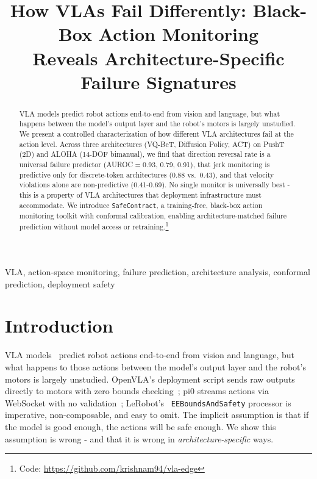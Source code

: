\documentclass[conference]{IEEEtran}
\begin{document}
\title{How VLAs Fail Differently: Black-Box Action Monitoring\\Reveals Architecture-Specific Failure Signatures}

\author{
}

\maketitle

\begin{abstract}
VLA models predict robot actions end-to-end from vision and language, but what happens between the model's output layer and the robot's motors is largely unstudied.
We present a controlled characterization of how different VLA architectures fail at the action level.
Across three architectures (VQ-BeT, Diffusion Policy, ACT) on PushT (2D) and ALOHA (14-DOF bimanual), we find that direction reversal rate is a universal failure predictor (AUROC${=}$0.93, 0.79, 0.91), that jerk monitoring is predictive only for discrete-token architectures (0.88 vs.\ 0.43), and that velocity violations alone are non-predictive (0.41-0.69).
No single monitor is universally best - this is a property of VLA architectures that deployment infrastructure must accommodate.
We introduce \texttt{SafeContract}, a training-free, black-box action monitoring toolkit with conformal calibration, enabling architecture-matched failure prediction without model access or retraining.\footnote{Code: \url{https://github.com/krishnam94/vla-edge}}
\end{abstract}

\begin{IEEEkeywords}
VLA, action-space monitoring, failure prediction, architecture analysis, conformal prediction, deployment safety
\end{IEEEkeywords}

\section{Introduction}

VLA models~\cite{openvla,smolvla} predict robot actions end-to-end from vision and language, but what happens to those actions between the model's output layer and the robot's motors is largely unstudied.
OpenVLA's deployment script sends raw outputs directly to motors with zero bounds checking~\cite{openvla};
pi0 streams actions via WebSocket with no validation~\cite{pi0};
LeRobot's~\cite{lerobot} \texttt{EEBoundsAndSafety} processor is imperative, non-composable, and easy to omit.
The implicit assumption is that if the model is good enough, the actions will be safe enough.
We show this assumption is wrong - and that it is wrong in \emph{architecture-specific} ways.
\end{document}
